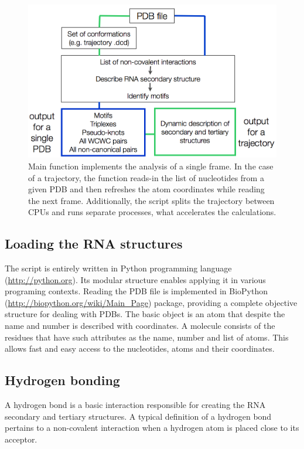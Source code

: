 \documentclass[12pt]{article}
\begin{document}
\begin{figure}[h!]
\centering
\includegraphics[scale=0.4]{./pictures/workflow.png}
\caption{Main function implements the analysis of a single frame. In the case of a trajectory, the function reads-in the list of nucleotides from a given PDB and then refreshes the atom coordinates while reading the next frame. Additionally, the script splits the trajectory between CPUs and runs separate processes, what  accelerates the calculations.}
\label{ProgramScheme}
\end{figure}

\subsection{Loading the RNA structures}
The script is entirely written in Python programming language (\url{http://python.org}). Its modular structure enables applying it in various programing contexts. Reading the PDB file is implemented  in  BioPython (\url{http://biopython.org/wiki/Main_Page}) package, providing a complete objective structure for dealing with PDBs. The basic object is an atom that despite the name and number is described with coordinates. A molecule consists of the residues that have such attributes as the name, number and list of atoms. This allows fast and easy access to the nucleotides, atoms and their coordinates.

\subsection{Hydrogen bonding}
A hydrogen bond is a basic interaction responsible for creating the RNA secondary and tertiary structures. A typical definition of a hydrogen bond pertains to a non-covalent interaction when a hydrogen atom is placed close to its acceptor.
\end{document}
